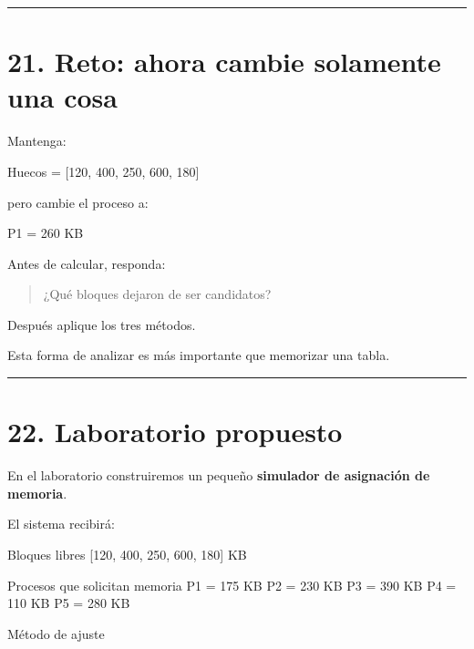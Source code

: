 \documentclass[
  spanish,
  letterpaper,
]{scrbook}
\newenvironment{Shaded}{\begin{snugshade}}{\end{snugshade}}
\newcommand{\NormalTok}[1]{\textcolor[rgb]{0.00,0.23,0.31}{#1}}
\begin{document}
\begin{center}\rule{0.5\linewidth}{0.5pt}\end{center}


\chapter{21. Reto: ahora cambie solamente una
cosa}\label{reto-ahora-cambie-solamente-una-cosa-1}

Mantenga:

\begin{Shaded}
\begin{Highlighting}[]
\NormalTok{Huecos = [120, 400, 250, 600, 180]}
\end{Highlighting}
\end{Shaded}

pero cambie el proceso a:

\begin{Shaded}
\begin{Highlighting}[]
\NormalTok{P1 = 260 KB}
\end{Highlighting}
\end{Shaded}

Antes de calcular, responda:

\begin{quote}
¿Qué bloques dejaron de ser candidatos?
\end{quote}

Después aplique los tres métodos.

Esta forma de analizar es más importante que memorizar una tabla.

\begin{center}\rule{0.5\linewidth}{0.5pt}\end{center}


\chapter{22. Laboratorio propuesto}\label{laboratorio-propuesto-1}

En el laboratorio construiremos un pequeño \textbf{simulador de
asignación de memoria}.

El sistema recibirá:

\begin{Shaded}
\begin{Highlighting}[]
\NormalTok{Bloques libres}
\NormalTok{[120, 400, 250, 600, 180] KB}

\NormalTok{Procesos que solicitan memoria}
\NormalTok{P1 = 175 KB}
\NormalTok{P2 = 230 KB}
\NormalTok{P3 = 390 KB}
\NormalTok{P4 = 110 KB}
\NormalTok{P5 = 280 KB}

\NormalTok{Método de ajuste}
\end{Highlighting}
\end{Shaded}
\end{document}
